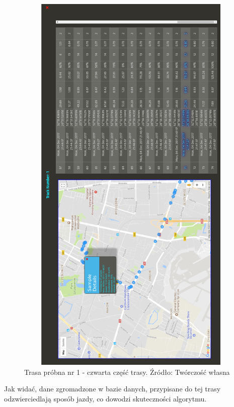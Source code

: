 \begin{figure}[H]
	\centering
	\includegraphics[height=19cm, width=13cm]{img/driving_analysis/test_track_part_4.png}
	\caption{Trasa próbna nr 1 - czwarta część trasy. Źródło: Twórczość własna}
	\label{fig:image_driving_analysis_alghoritm_track_1_part_4}
\end{figure}

Jak widać, dane zgromadzone w bazie danych, przypisane do tej trasy odzwierciedlają sposób jazdy, co dowodzi skuteczności algorytmu.
